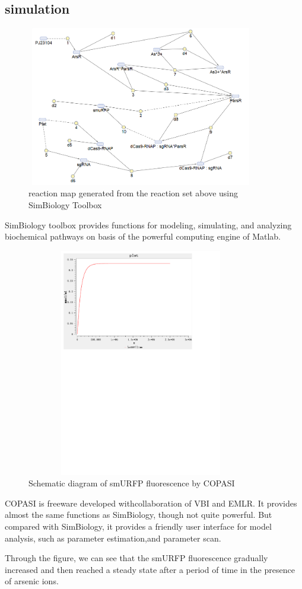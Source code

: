 \subsection{simulation }
\begin{figure}[h]
	\centering
	\includegraphics[width=10cm,height=7cm]{screenshot003}	
	\caption{reaction map generated from the reaction set above using SimBiology Toolbox}
\end{figure}
SimBiology toolbox provides functions for modeling, simulating, and analyzing biochemical pathways on basis of the powerful computing engine of Matlab.

\begin{figure}[h]
	\centering
	\includegraphics[width=10cm,height=10cm]{smuRFP}
	\caption{Schematic diagram of smURFP fluorescence by COPASI}
\end{figure}



COPASI is freeware developed withcollaboration of VBI and EMLR. It provides
almost the same functions as SimBiology, though not quite powerful. But compared with SimBiology, it provides a friendly user interface for model analysis, such as parameter estimation,and parameter scan.

Through the figure, we can see that the smURFP fluorescence gradually increased and then reached a steady state after a period of time  in the presence of arsenic ions.









